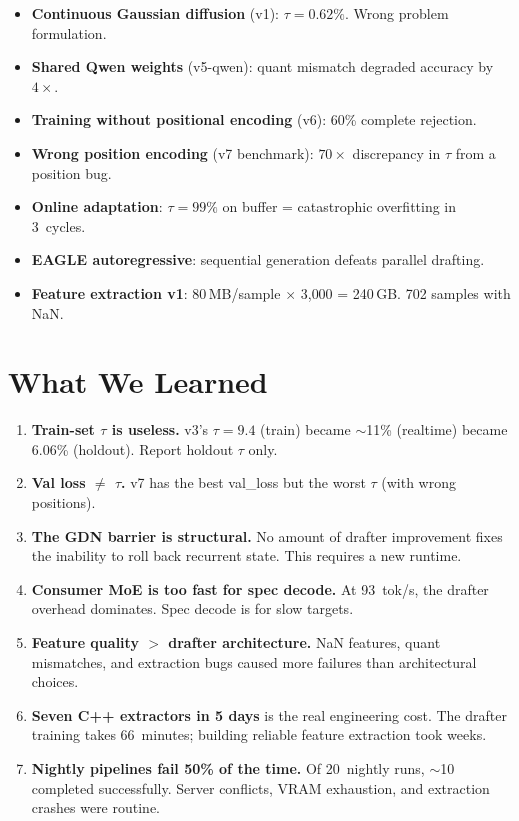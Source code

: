\documentclass[10pt,a4paper]{article}
\begin{document}
\begin{itemize}
  \item \textbf{Continuous Gaussian diffusion} (v1): $\tau{=}0.62\%$. Wrong problem formulation.
  \item \textbf{Shared Qwen weights} (v5-qwen): quant mismatch degraded accuracy by $4{\times}$.
  \item \textbf{Training without positional encoding} (v6): 60\% complete rejection.
  \item \textbf{Wrong position encoding} (v7 benchmark): $70{\times}$ discrepancy in $\tau$ from a position bug.
  \item \textbf{Online adaptation}: $\tau{=}99\%$ on buffer = catastrophic overfitting in 3~cycles.
  \item \textbf{EAGLE autoregressive}: sequential generation defeats parallel drafting.
  \item \textbf{Feature extraction v1}: 80\,MB/sample $\times$ 3{,}000 = 240\,GB. 702 samples with NaN.
\end{itemize}

\section{What We Learned}

\begin{enumerate}
  \item \textbf{Train-set $\tau$ is useless.} v3's $\tau{=}9.4$ (train) became $\sim$11\% (realtime) became 6.06\% (holdout). Report holdout $\tau$ only.
  \item \textbf{Val loss $\neq$ $\tau$.} v7 has the best val\_loss but the worst $\tau$ (with wrong positions).
  \item \textbf{The GDN barrier is structural.} No amount of drafter improvement fixes the inability to roll back recurrent state. This requires a new runtime.
  \item \textbf{Consumer MoE is too fast for spec decode.} At 93~tok/s, the drafter overhead dominates. Spec decode is for slow targets.
  \item \textbf{Feature quality $>$ drafter architecture.} NaN features, quant mismatches, and extraction bugs caused more failures than architectural choices.
  \item \textbf{Seven C++ extractors in 5 days} is the real engineering cost. The drafter training takes 66~minutes; building reliable feature extraction took weeks.
  \item \textbf{Nightly pipelines fail 50\% of the time.} Of 20~nightly runs, $\sim$10 completed successfully. Server conflicts, VRAM exhaustion, and extraction crashes were routine.
\end{enumerate}
\end{document}
